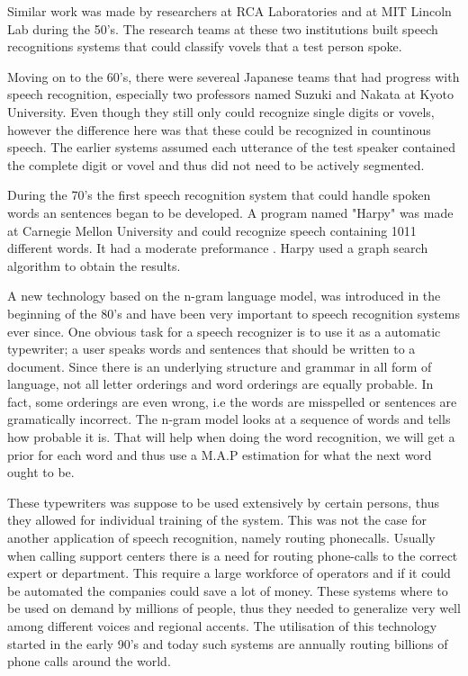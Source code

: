 \documentclass[a4paper,12pt,twoside]{ltxdoc}
\begin{document}
Similar work was made by researchers at RCA Laboratories and at MIT Lincoln Lab during the 50's. The research teams at these two institutions built speech recognitions systems that could classify vovels that a test person spoke.

Moving on to the 60's, there were severeal Japanese teams that had progress with speech recognition, especially two professors named Suzuki and Nakata at Kyoto University. Even though they still only could recognize single digits or vovels, however the difference here was that these could be recognized in countinous speech. The earlier systems assumed each utterance of the test speaker contained the complete digit or vovel and thus did not need to be actively segmented.  

During the 70's the first speech recognition system that could handle spoken words an sentences began to be developed. A program named "Harpy" was made at Carnegie Mellon University and could recognize speech containing 1011 different words. It had a moderate preformance . Harpy used a graph search algorithm to obtain the results. 

A new technology based on the n-gram language model, was introduced in the beginning of the 80's and have been very important to speech recognition systems ever since. One obvious task for a speech recognizer is to use it as a automatic typewriter; a user speaks words and sentences that should be written to a document. Since there is an underlying structure and grammar in all form of language, not all letter orderings and word orderings are equally probable. In fact, some orderings are even wrong, i.e the words are misspelled or sentences are gramatically incorrect. The n-gram model looks at a sequence of words and tells how probable it is. That will help when doing the word recognition, we will get a prior for each word and thus use a M.A.P estimation for what the next word ought to be.

These typewriters was suppose to be used extensively by certain persons, thus they allowed for individual training of the system. This was not the case for another application of speech recognition, namely routing phonecalls. Usually when calling support centers there is a need for routing phone-calls to the correct expert or department. This require a large workforce of operators and if it could be automated the companies could save a lot of money. These systems where to be used on demand by millions of people, thus they needed to generalize very well among different voices and regional accents. The utilisation of this technology started in the early 90's and today such systems are annually routing billions of phone calls around the world. 
\end{document}
